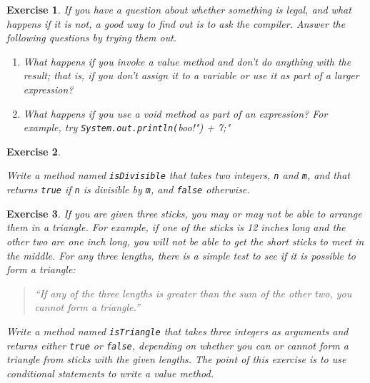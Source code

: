 \documentclass[12pt]{book}
\theoremstyle{exercise}
\newtheorem{exercise}{Exercise}[chapter]
\newcommand{\java}[1]{\verb"#1"}
\newcommand{\java}[1]{\lstinline{#1}} %
\begin{document}
\begin{exercise}

If you have a question about whether something is legal, and what happens if it is not, a good way to find out is to ask the compiler.
Answer the following questions by trying them out.

\begin{enumerate}

\item What happens if you invoke a value method and don't do anything with the result; that is, if you don't assign it to a variable or use it as part of a larger expression?

\item What happens if you use a void method as part of an expression?
For example, try \java{System.out.println("boo!") + 7;}


\end{enumerate}

\end{exercise}


\begin{exercise}
\label{ex.isdiv}

Write a method named \java{isDivisible} that takes two integers, \java{n} and \java{m}, and that returns \java{true} if \java{n} is divisible by \java{m}, and \java{false} otherwise.

\end{exercise}


\begin{exercise}

If you are given three sticks, you may or may not be able to arrange them in a triangle.
For example, if one of the sticks is 12 inches long and the other two are one inch long, you will not be able to get the short sticks to meet in the middle.
For any three lengths, there is a simple test to see if it is possible to form a triangle:

\begin{quote}
``If any of the three lengths is greater than the sum of the other two, you cannot form a triangle.''
\end{quote}

Write a method named \java{isTriangle} that takes three integers as arguments and returns either \java{true} or \java{false}, depending on whether you can or cannot form a triangle from sticks with the given lengths.
The point of this exercise is to use conditional statements to write a value method.

\end{exercise}
\end{document}
